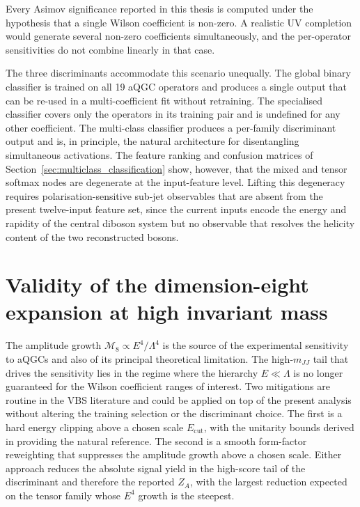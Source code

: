 Every Asimov significance reported in this thesis is computed under the hypothesis that a single Wilson coefficient is non-zero. A realistic UV completion would generate several non-zero coefficients simultaneously, and the per-operator sensitivities do not combine linearly in that case.

The three discriminants accommodate this scenario unequally. The global binary classifier is trained on all 19 aQGC operators and produces a single output that can be re-used in a multi-coefficient fit without retraining. The specialised classifier covers only the operators in its training pair and is undefined for any other coefficient. The multi-class classifier produces a per-family discriminant output and is, in principle, the natural architecture for disentangling simultaneous activations. The feature ranking and confusion matrices of Section~\ref{sec:multiclass_classification} show, however, that the mixed and tensor softmax nodes are degenerate at the input-feature level. Lifting this degeneracy requires polarisation-sensitive sub-jet observables that are absent from the present twelve-input feature set, since the current inputs encode the energy and rapidity of the central diboson system but no observable that resolves the helicity content of the two reconstructed bosons.

\section{Validity of the dimension-eight expansion at high invariant mass}
\label{sec:disc_eft_validity}

The amplitude growth $\mathcal{M}_8\propto E^4/\Lambda^4$ is the source of the experimental sensitivity to aQGCs and also of its principal theoretical limitation. The high-$m_{JJ}$ tail that drives the sensitivity lies in the regime where the hierarchy $E\ll\Lambda$ is no longer guaranteed for the Wilson coefficient ranges of interest. Two mitigations are routine in the VBS literature and could be applied on top of the present analysis without altering the training selection or the discriminant choice. The first is a hard energy clipping above a chosen scale $E_{\mathrm{cut}}$, with the unitarity bounds derived in \cite{PhysRevD.101.113003} providing the natural reference. The second is a smooth form-factor reweighting that suppresses the amplitude growth above a chosen scale. Either approach reduces the absolute signal yield in the high-score tail of the discriminant and therefore the reported $Z_A$, with the largest reduction expected on the tensor family whose $E^4$ growth is the steepest.

